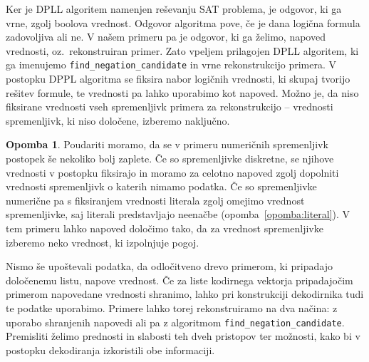 \documentclass[12pt,a4paper,twoside]{article}
\theoremstyle{definition} %
\newtheorem{opomba}[definicija]{Opomba}
\theoremstyle{plain} %
\numberwithin{equation}{section}  %
\begin{document}

Ker je DPLL algoritem namenjen reševanju SAT problema, je odgovor, ki ga vrne, zgolj boolova vrednost.
Odgovor algoritma pove, če je dana logična formula zadovoljiva ali ne.
V našem primeru pa je odgovor, ki ga želimo, napoved vrednosti, oz.\ rekonstruiran primer.
Zato vpeljem prilagojen DPLL algoritem, ki ga imenujemo \texttt{find\_\-negation\_\-candidate} in vrne rekonstrukcijo primera.
V postopku DPPL algoritma se fiksira nabor logičnih vrednosti, ki skupaj tvorijo rešitev formule, te vrednosti pa lahko uporabimo kot napoved. %
Možno je, da niso fiksirane vrednosti vseh spremenljivk primera za rekonstrukcijo -- vrednosti spremenljivk, ki niso določene, izberemo naključno.

\begin{opomba}
	Poudariti moramo, da se v primeru numeričnih spremenljivk postopek še nekoliko bolj zaplete.
	Če so spremenljivke diskretne, se njihove vrednosti v postopku fiksirajo in moramo za celotno napoved zgolj dopolniti vrednosti spremenljivk o katerih nimamo podatka.
	Če so spremenljivke numerične pa s fiksiranjem vrednosti literala zgolj omejimo vrednost spremenljivke, saj literali predstavljajo neenačbe (opomba~\ref{opomba:literal}).
	V tem primeru lahko napoved določimo tako, da za vrednost spremenljivke izberemo neko vrednost, ki izpolnjuje pogoj.
\end{opomba}

Nismo še upoštevali podatka, da odločitveno drevo primerom, ki pripadajo določenemu listu, napove vrednost.
Če za liste kodirnega vektorja pripadajočim primerom napovedane vrednosti shranimo, lahko pri konstrukciji dekodirnika tudi te podatke uporabimo.
Primere lahko torej rekonstruiramo na dva načina: z uporabo shranjenih napovedi ali pa z algoritmom \texttt{find\_\-negation\_\-candidate}.
Premisliti želimo prednosti in slabosti teh dveh pristopov ter možnosti, kako bi v postopku dekodiranja izkoristili obe informaciji.
\end{document}
